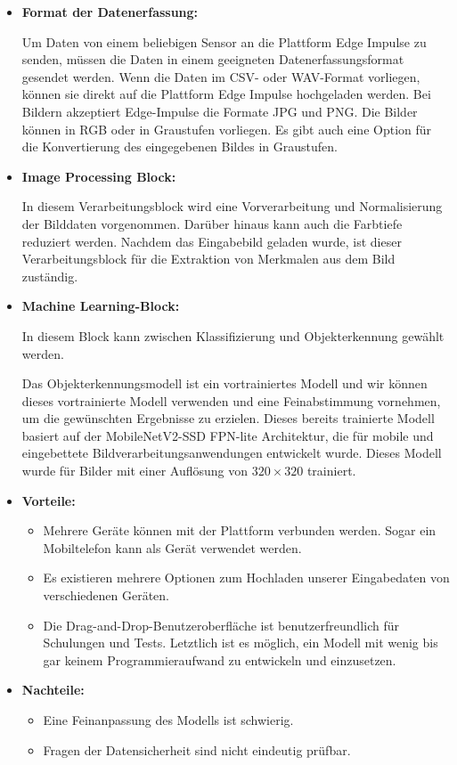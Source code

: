 \begin{itemize}
  \item \textbf{Format der Datenerfassung:}
	
        Um Daten von einem beliebigen Sensor an die Plattform Edge Impulse zu senden, müssen die Daten in einem geeigneten Datenerfassungsformat gesendet werden. Wenn die Daten im CSV- oder WAV-Format vorliegen, können sie direkt auf die Plattform Edge Impulse hochgeladen werden. Bei Bildern akzeptiert Edge-Impulse die Formate JPG und PNG. Die Bilder können in RGB oder in Graustufen vorliegen. Es gibt auch eine Option für die Konvertierung des eingegebenen Bildes in Graustufen. 
        
  \item \textbf{Image Processing Block:} 
  
        In diesem Verarbeitungsblock wird eine Vorverarbeitung und Normalisierung der Bilddaten vorgenommen. Darüber hinaus kann auch die Farbtiefe reduziert werden. Nachdem das Eingabebild geladen wurde, ist dieser Verarbeitungsblock für die Extraktion von Merkmalen aus dem Bild zuständig.

  \item \textbf{Machine Learning-Block:} 
  
        In diesem Block kann zwischen Klassifizierung und Objekterkennung gewählt werden. 
        
        Das Objekterkennungsmodell ist ein vortrainiertes Modell und wir können dieses vortrainierte Modell verwenden und eine Feinabstimmung vornehmen, um die gewünschten Ergebnisse zu erzielen. Dieses bereits trainierte Modell basiert auf der MobileNetV2-SSD FPN-lite Architektur, die für mobile und eingebettete Bildverarbeitungsanwendungen entwickelt wurde. Dieses Modell wurde für Bilder mit einer Auflösung von $320 \times 320$ trainiert.
        
  \item \textbf{Vorteile:}

    \begin{itemize}
	  \item Mehrere Geräte können mit der Plattform verbunden werden. Sogar ein Mobiltelefon kann als Gerät verwendet werden.
	  \item	Es existieren mehrere Optionen zum Hochladen unserer Eingabedaten von verschiedenen Geräten.
	  \item	Die Drag-and-Drop-Benutzeroberfläche ist benutzerfreundlich für Schulungen und Tests. Letztlich ist es möglich, ein Modell mit wenig bis gar keinem Programmieraufwand zu entwickeln und einzusetzen.
    \end{itemize}
	
  \item  \textbf{Nachteile:}
    \begin{itemize}
	  \item	Eine Feinanpassung des Modells ist schwierig.
	  \item	Fragen der Datensicherheit sind nicht eindeutig prüfbar.
    \end{itemize}
\end{itemize}


